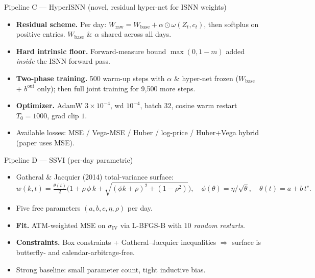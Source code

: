 \documentclass[10pt,aspectratio=169]{beamer}
\newcommand{\iv}{\sigma_{\mathrm{IV}}}
\begin{document}
\begin{frame}{Pipeline C --- HyperISNN (novel, residual hyper-net for ISNN weights)}
\centering
{}
\medskip
\begin{itemize}\small
  \item \textbf{Residual scheme.} Per day: $W_{\mathrm{raw}} = W_{\mathrm{base}} + \alpha \odot \omega(Z_t, c_t)$, then softplus on positive entries. $W_{\mathrm{base}}$ \& $\alpha$ shared across all days.
  \item \textbf{Hard intrinsic floor.} Forward-measure bound $\max(0, 1{-}m)$ added \emph{inside} the ISNN forward pass.
  \item \textbf{Two-phase training.} 500 warm-up steps with $\alpha$ \& hyper-net frozen ($W_{\mathrm{base}}$ + $b^{\mathrm{out}}$ only); then full joint training for 9{,}500 more steps.
  \item \textbf{Optimizer.} AdamW $3{\times}10^{-4}$, wd $10^{-4}$, batch $32$, cosine warm restart $T_0{=}1000$, grad clip $1$.
  \item Available losses: MSE / Vega-MSE / Huber / log-price / Huber+Vega hybrid (paper uses MSE).
\end{itemize}
\end{frame}

\begin{frame}{Pipeline D --- SSVI (per-day parametric)}
\begin{itemize}\small
  \item Gatheral \& Jacquier (2014) total-variance surface:
  \[
    w(k, t) = \tfrac{\theta(t)}{2}\Big(1 + \rho\, \phi\, k + \sqrt{(\phi k + \rho)^2 + (1 - \rho^2)}\Big),
    \quad \phi(\theta) = \eta / \sqrt{\theta},
    \quad \theta(t) = a + b\, t^c.
  \]
  \item Five free parameters $(a, b, c, \eta, \rho)$ per day.
  \item \textbf{Fit.} ATM-weighted MSE on $\iv$ via L-BFGS-B with \emph{$10$ random restarts}.
  \item \textbf{Constraints.} Box constraints + Gatheral--Jacquier inequalities $\Rightarrow$ surface is butterfly- and calendar-arbitrage-free.
  \item Strong baseline: small parameter count, tight inductive bias.
\end{itemize}
\end{frame}
\end{document}
